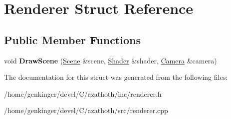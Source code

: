 \hypertarget{structRenderer}{}\section{Renderer Struct Reference}
\label{structRenderer}
\subsection*{Public Member Functions}
\begin{DoxyCompactItemize}
\item 
\mbox{\label{structRenderer_aef799e1440c7a490457c969ea1bafea1}} 
void {\bfseries Draw\+Scene} (\mbox{\hyperlink{structScene}{Scene}} \&scene, \mbox{\hyperlink{classShader}{Shader}} \&shader, \mbox{\hyperlink{structCamera}{Camera}} \&camera)
\end{DoxyCompactItemize}


The documentation for this struct was generated from the following files\+:\begin{DoxyCompactItemize}
\item 
/home/genkinger/devel/\+C/azathoth/inc/renderer.\+h\item 
/home/genkinger/devel/\+C/azathoth/src/renderer.\+cpp\end{DoxyCompactItemize}
